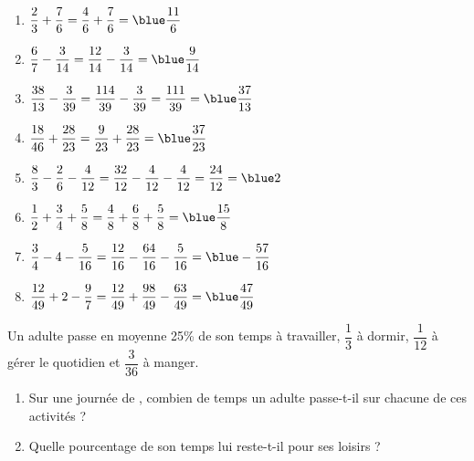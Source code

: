 \begin{colonne*exercice}
\begin{corrige}
   \ \\ [-5mm]
   \begin{enumerate}
      \item $\dfrac23+\dfrac76 =\dfrac46+\dfrac76 =\blue \dfrac{11}6$ \bigskip
      \item $\dfrac67-\dfrac3{14} =\dfrac{12}{14}-\dfrac3{14} =\blue \dfrac9{14}$ \bigskip
      \item $\dfrac{38}{13}-\dfrac3{39} =\dfrac{114}{39}-\dfrac3{39} =\dfrac{111}{39} =\blue \dfrac{37}{13}$ \bigskip
      \item $\dfrac{18}{46}+\dfrac{28}{23} =\dfrac{9}{23}+\dfrac{28}{23} =\blue \dfrac{37}{23}$ \bigskip
      \item $\dfrac83-\dfrac26-\dfrac4{12} =\dfrac{32}{12}-\dfrac{4}{12}-\dfrac{4}{12} =\dfrac{24}{12} =\blue 2$ \bigskip
      \item $\dfrac12+\dfrac34+\dfrac58 =\dfrac48+\dfrac68+\dfrac58 =\blue \dfrac{15}{8}$ \bigskip
      \item $\dfrac34-4-\dfrac5{16} =\dfrac{12}{16}-\dfrac{64}{16}-\dfrac{5}{16} =\blue -\dfrac{57}{16}$ \bigskip
      \item $\dfrac{12}{49}+2-\dfrac97 =\dfrac{12}{49}+\dfrac{98}{49}-\dfrac{63}{49} =\blue \dfrac{47}{49}$
   \end{enumerate}
\end{corrige}

\bigskip


\begin{exercice} %
   Un adulte passe en moyenne 25\% de son temps à travailler, $\dfrac13$ à dormir, $\dfrac{1}{12}$ à gérer le quotidien et $\dfrac{3}{36}$ à manger.
   \begin{enumerate}
      \item Sur une journée de , combien de temps un adulte passe-t-il sur chacune de ces activités ?
      \item Quelle pourcentage de son temps lui reste-t-il pour ses loisirs ?
   \end{enumerate}
\end{exercice}


\end{colonne*exercice}
